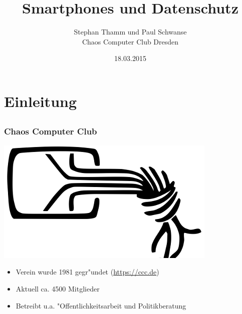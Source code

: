 \documentclass[12pt]{beamer}
\title{Smartphones und Datenschutz}
\author{\small Stephan Thamm und Paul Schwanse\\\large Chaos Computer Club Dresden}
\date{18.03.2015}
\begin{document}
\maketitle


\section{Einleitung}
\subsection{}

\begin{frame}
    \frametitle{Chaos Computer Club}
    \begin{center}
	\includegraphics[height=0.2\textheight]{img/chaosknoten.png}
    \end{center}	
    \begin{itemize}
      \item<1-> Verein wurde 1981 gegr"undet (\url{https://ccc.de})          
      \item<2-> Aktuell ca. 4500 Mitglieder
      \item<3-> Betreibt u.a. "Offentlichkeitsarbeit und Politikberatung      
    \end{itemize}
\end{frame}
\end{document}
